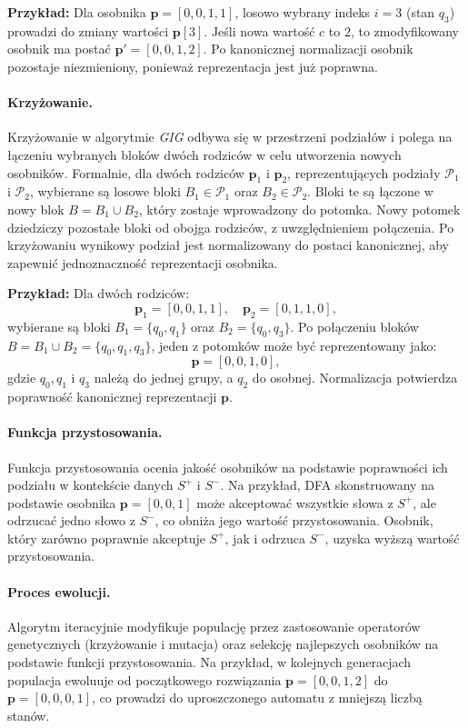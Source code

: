 \textbf{Przykład:}  
Dla osobnika \( \mathbf{p} = [0, 0, 1, 1] \), losowo wybrany indeks \( i = 3 \) (stan \( q_3 \)) prowadzi do zmiany wartości \( \mathbf{p}[3] \). Jeśli nowa wartość \( c \) to \( 2 \), to zmodyfikowany osobnik ma postać \( \mathbf{p}' = [0, 0, 1, 2] \). Po kanonicznej normalizacji osobnik pozostaje niezmieniony, ponieważ reprezentacja jest już poprawna.

\paragraph*{Krzyżowanie.}  
Krzyżowanie w algorytmie \textit{GIG} odbywa się w przestrzeni podziałów i polega na łączeniu wybranych bloków dwóch rodziców w celu utworzenia nowych osobników. Formalnie, dla dwóch rodziców \( \mathbf{p}_1 \) i \( \mathbf{p}_2 \), reprezentujących podziały \( \mathcal{P}_1 \) i \( \mathcal{P}_2 \), wybierane są losowe bloki \( B_1 \in \mathcal{P}_1 \) oraz \( B_2 \in \mathcal{P}_2 \). Bloki te są łączone w nowy blok \( B = B_1 \cup B_2 \), który zostaje wprowadzony do potomka. Nowy potomek dziedziczy pozostałe bloki od obojga rodziców, z uwzględnieniem połączenia. Po krzyżowaniu wynikowy podział jest normalizowany do postaci kanonicznej, aby zapewnić jednoznaczność reprezentacji osobnika.

\textbf{Przykład:}  
Dla dwóch rodziców:  
\[
\mathbf{p}_1 = [0, 0, 1, 1], \quad \mathbf{p}_2 = [0, 1, 1, 0],
\]
wybierane są bloki \( B_1 = \{q_0, q_1\} \) oraz \( B_2 = \{q_0, q_3\} \). Po połączeniu bloków \( B = B_1 \cup B_2 = \{q_0, q_1, q_3\} \), jeden z potomków może być reprezentowany jako:
\[
\mathbf{p} = [0, 0, 1, 0],
\]
gdzie \( q_0, q_1 \) i \( q_3 \) należą do jednej grupy, a \( q_2 \) do osobnej. Normalizacja potwierdza poprawność kanonicznej reprezentacji \( \mathbf{p} \).

\paragraph*{Funkcja przystosowania.}  
Funkcja przystosowania ocenia jakość osobników na podstawie poprawności ich podziału w kontekście danych \( S^+ \) i \( S^- \). Na przykład, DFA skonstruowany na podstawie osobnika \( \mathbf{p} = [0, 0, 1] \) może akceptować wszystkie słowa z \( S^+ \), ale odrzucać jedno słowo z \( S^- \), co obniża jego wartość przystosowania. Osobnik, który zarówno poprawnie akceptuje \( S^+ \), jak i odrzuca \( S^- \), uzyska wyższą wartość przystosowania.

\paragraph*{Proces ewolucji.}  
Algorytm iteracyjnie modyfikuje populację przez zastosowanie operatorów genetycznych (krzyżowanie i mutacja) oraz selekcję najlepszych osobników na podstawie funkcji przystosowania. Na przykład, w kolejnych generacjach populacja ewoluuje od początkowego rozwiązania \( \mathbf{p} = [0, 0, 1, 2] \) do \( \mathbf{p} = [0, 0, 0, 1] \), co prowadzi do uproszczonego automatu z mniejszą liczbą stanów.

